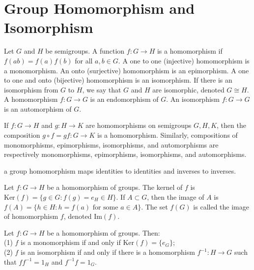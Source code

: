 \chapter{Group Homomorphism and Isomorphism}\label{chp:1_8}

\begin{definition}{}{}
    Let $G$ and $H$ be semigroups.
    A function $f:G\rightarrow H$ is a homomorphism
    if $f(ab)=f(a)f(b)$ for all $a,b\in G$.
    A one to one (injective) homomorphism is a monomorphism.
    An onto (surjective) homomorphism is an epimorphism.
    A one to one and onto (bijective) homomorphism is an isomorphism.
    If there is an isomorphism from $G$ to $H$, we say that
    $G$ and $H$ are isomorphic, denoted $G\cong H$. 
    A homomorphism $f:G\rightarrow G$ is an endomorphism of $G$.
    An isomorphism $f:G\rightarrow G$ is an automorphism of $G$. 
\end{definition}

\begin{proposition}{}{}
    If $f : G \rightarrow H$ and 
    $g : H \rightarrow K$ 
    are homomorphisms on semigroups $G, H, K$,
    then the composition $g \circ f = gf : G \rightarrow K$ 
    is a homomorphism. 
    Similarly, compositions of monomorphisms, epimorphisms, isomorphisms, and automorphisms are
    respectively monomorphisms, epimorphisms, isomorphisms, and automorphisms.
\end{proposition}

\begin{proposition}{}{}
    a group homomorphism maps identities to identities and inverses to inverses.
\end{proposition}

\begin{definition}{}{}
    Let $f:G\rightarrow H$ be a homomorphism of groups.
    The kernel of $f$ is $\text{Ker}(f)=\{g\in G:f(g)=e_H\in H\}$.
    If $A\subset G$, then the image of $A$ is $f(A)=\{h\in H:h=f(a) \text{ for some }a\in A\}$.
    The set $f(G)$ is called the image of homomorphism $f$, denoted $\text{Im}(f)$.
\end{definition}

\begin{proposition}{}{}
    Let $f:G\rightarrow H$ be a homomorphism of groups. Then:\\
    (1) $f$ is a monomorphism if and only if $\text{Ker}(f)=\{e_G\}$;\\
    (2) $f$ is an isomorphism if and only if there is a homomorphism
    $f^{-1}:H\rightarrow G$ such that $ff^{-1}=1_H$ and $f^{-1}f=1_G$.
\end{proposition}


